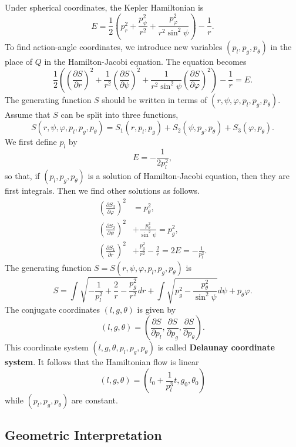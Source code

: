 \documentclass{amsart}
\newcommand{\vp}{\varphi}
\newcommand{\pp}{\partial}
\begin{document}
	Under spherical coordinates, the Kepler Hamiltonian is
	$$
	E = \frac{1}{2}\left(p_r^2 + \frac{p_\psi^2}{r^2}+\frac{p_\vp^2}{r^2\sin^2\psi}\right)-\frac{1}{r}.
	$$	
	To find action-angle coordinates, we introduce new variables $(p_l,p_g,p_\theta)$ in the place of $Q$ in the Hamilton-Jacobi equation.
	The equation becomes
	$$
	\frac{1}{2}\left(\left(\frac{\pp S}{\pp r}\right)^2 + \frac{1}{r^2}\left(\frac{\pp S}{\pp \psi}\right)^2 + \frac{1}{r^2\sin^2\psi}\left(\frac{\pp S}{\pp \vp}\right)^2\right) - \frac{1}{r} = E.
	$$
	The generating function $S$ should be written in terms of $(r,\psi,\vp,p_l,p_g,p_\theta)$.
	Assume that $S$ can be split into three functions,
	$$
	S(r,\psi,\vp,p_l,p_g,p_\theta) = S_1(r,p_l,p_g) + S_2(\psi,p_g,p_\theta) + S_3(\vp,p_\theta).
	$$
	We first define $p_l$ by
	$$
	E = -\frac{1}{2p_l^2},
	$$
	so that, if $(p_l,p_g,p_\theta)$ is a solution of Hamilton-Jacobi equation, then they are first integrals.
	Then we find other solutions as follows.
	$$
	\begin{aligned}
		\left(\frac{\pp S_3}{\pp \vp}\right)^2 & = p_\theta^2,\\
		\left(\frac{\pp S_2}{\pp \psi}\right)^2& + \frac{p_\theta^2}{\sin^2\psi} = p_g^2,\\
		\left(\frac{\pp S_1}{\pp r}\right)^2& + \frac{p_g^2}{r^2} - \frac{2}{r} = 2E = -\frac{1}{p_l^2}.
	\end{aligned}
	$$
	The generating function $S=S(r,\psi,\vp,p_l,p_g,p_\theta)$ is
	$$
	S = \int \sqrt{-\frac{1}{p_l^2}+\frac{2}{r}-\frac{p_g^2}{r^2}}dr
	+\int \sqrt{p_g^2 - \frac{p_\theta^2}{\sin^2\psi}}d\psi
	+p_\theta \vp.
	$$
	The conjugate coordinates $(l,g,\theta)$ is given by
	$$
	(l,g,\theta) = \left(\frac{\pp S}{\pp p_l},\frac{\pp S}{\pp p_g},\frac{\pp S}{\pp p_\theta}\right).
	$$
	This coordinate system $(l,g,\theta,p_l,p_g,p_\theta)$ is called \textbf{Delaunay coordinate system}.
	It follows that the Hamiltonian flow is linear
	$$
	(l,g,\theta) = \left(l_0 + \frac{1}{p_l^3}t,g_0,\theta_0\right)
	$$
	while $(p_l,p_g,p_\theta)$ are constant.
	
	\subsection{Geometric Interpretation}
	
\end{document}
